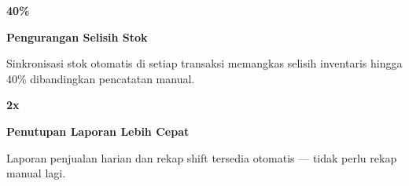 \documentclass[a4paper]{article}
\begin{document}
\noindent
\begin{minipage}[t]{0.485\textwidth}
    \noindent\colorbox{BlueBg}{%
        \begin{minipage}[t][2.7cm][c]{\dimexpr\linewidth-2\fboxsep\relax}
            \centering
            {\fontsize{20}{24}\selectfont\bfseries\color{AmberPrimary} 40\%}\par\vspace{2pt}
            {\fontsize{9.5}{12}\selectfont\bfseries\color{BlueDark} Pengurangan Selisih Stok}\par\vspace{2pt}
            {\fontsize{8.5}{11}\selectfont\color{TextDark}Sinkronisasi stok otomatis di setiap transaksi memangkas selisih inventaris hingga 40\% dibandingkan pencatatan manual.}
        \end{minipage}}\par
    \vspace{6pt}
    \noindent\colorbox{BlueBg}{%
        \begin{minipage}[t][2.7cm][c]{\dimexpr\linewidth-2\fboxsep\relax}
            \centering
            {\fontsize{20}{24}\selectfont\bfseries\color{AmberPrimary} 2x}\par\vspace{2pt}
            {\fontsize{9.5}{12}\selectfont\bfseries\color{BlueDark} Penutupan Laporan Lebih Cepat}\par\vspace{2pt}
            {\fontsize{8.5}{11}\selectfont\color{TextDark}Laporan penjualan harian dan rekap shift tersedia otomatis — tidak perlu rekap manual lagi.}
        \end{minipage}}%
\end{minipage}%
\hfill
\end{document}
